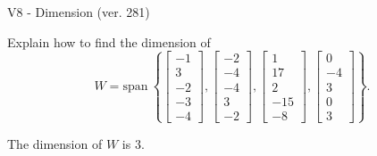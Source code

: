 \begin{exercise}
  \begin{exerciseTitle}V8 - Dimension (ver. 281)\end{exerciseTitle}
  \begin{exerciseStatement}
    Explain how to find the dimension of 
\[W=\mathrm{span}\ \left\{\left[\begin{array}{r}
-1 \\
3 \\
-2 \\
-3 \\
-4
\end{array}\right] , \left[\begin{array}{r}
-2 \\
-4 \\
-4 \\
3 \\
-2
\end{array}\right] , \left[\begin{array}{r}
1 \\
17 \\
2 \\
-15 \\
-8
\end{array}\right] , \left[\begin{array}{r}
0 \\
-4 \\
3 \\
0 \\
3
\end{array}\right]\right\}.\]



  \end{exerciseStatement}
  \begin{exerciseAnswer}
   The dimension of \(W\) is  \(3\).
  


  \end{exerciseAnswer}
\end{exercise}
